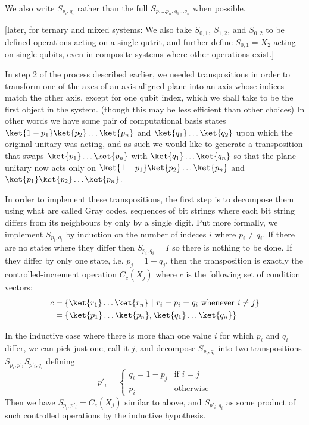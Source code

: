 We also write $S_{p_i, q_i}$ rather than the full $S_{p_1\dots p_n, q_1\dots q_n}$ when possible.

[later, for ternary and mixed systems: We also take $S_{0,1}$, $S_{1,2}$, and $S_{0,2}$ to be defined operations acting on a single qutrit, and further define $S_{0,1} = X_2$ acting on single qubits, even in composite systems where other operations exist.]

In step 2 of the process described earlier, we needed transpositions in order to transform one of the axes of an axis aligned plane into an axis whose indices match the other axis, except for one qubit index, which we shall take to be the first object in the system. (though this may be less efficient than other choices) In other words we have some pair of computational basis states $\ket{1-p_1}\ket{p_2}\dots\ket{p_n}$ and $\ket{q_1}\dots\ket{q_2}$ upon which the original unitary was acting, and as such we would like to generate a transposition that swaps $\ket{p_1}\dots \ket{p_n}$ with $\ket{q_1}\dots\ket{q_n}$ so that the plane unitary now acts only on $\ket{1-p_1}\ket{p_2}\dots \ket{p_n}$ and $\ket{p_1}\ket{p_2}\dots \ket{p_n}$.

In order to implement these transpositions, the first step is to decompose them using what are called Gray codes, sequences of bit strings where each bit string differs from its neighbours by only by a single digit. Put more formally, we implement $S_{p_i,q_i}$ by induction on the number of indeces $i$ where $p_i \neq q_i$. If there are no states where they differ then $S_{p_i,q_i} = I$ so there is nothing to be done. If they differ by only one state, i.e. $p_j = 1 - q_j$, then the transposition is exactly the controlled-increment operation $C_c(X_j)$ where $c$ is the following set of condition vectors:
\begin{align*}
	c &= \{\ket{r_1}\dots\ket{r_n}\ |\ r_i = p_i = q_i \text{\ whenever\ } i \neq j\}
	\\&= \{\ket{p_1}\dots\ket{p_n}, \ket{q_1}\dots\ket{q_n}\}
\end{align*}

In the inductive case where there is more than one value $i$ for which $p_i$ and $q_i$ differ, we can pick just one, call it $j$, and decompose $S_{p_i, q_i}$ into two transpositions $S_{p_i, p'_i}S_{p'_i, q_i}$ defining
\[p'_i = \begin{cases}
	q_i = 1 - p_j & \text{if\ } i = j \\
	p_i & \text{otherwise}
\end{cases}\]
Then we have $S_{p_i, p'_i} = C_c(X_j)$ similar to above, and $S_{p'_i, q_i}$ as some product of such controlled operations by the inductive hypothesis.

